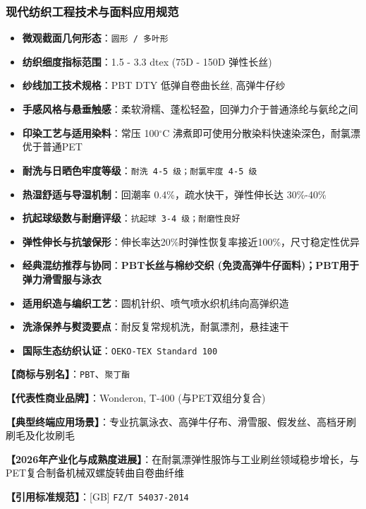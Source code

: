 \documentclass[11pt,openright,twoside,UTF8]{ctexbook}
\begin{document}
\subsubsection*{现代纺织工程技术与面料应用规范}
\begin{itemize} \setlength{\itemsep}{2pt}
    \item \textbf{微观截面几何形态}：\texttt{圆形 / 多叶形}
    \item \textbf{纺织细度指标范围}：1.5 - 3.3 dtex (75D - 150D 弹性长丝)
    \item \textbf{纱线加工技术规格}：PBT DTY 低弹自卷曲长丝, 高弹牛仔纱
    \item \textbf{手感风格与悬垂触感}：柔软滑糯、蓬松轻盈，回弹力介于普通涤纶与氨纶之间
    \item \textbf{印染工艺与适用染料}：常压 100$^\circ\mathrm{C}$ 沸煮即可使用分散染料快速染深色，耐氯漂优于普通PET
    \item \textbf{耐洗与日晒色牢度等级}：\texttt{耐洗 4-5 级；耐氯牢度 4-5 级}
    \item \textbf{热湿舒适与导湿机制}：回潮率 0.4\%，疏水快干，弹性伸长达 30\%-40\%
    \item \textbf{抗起球级数与耐磨评级}：\texttt{抗起球 3-4 级；耐磨性良好}
    \item \textbf{弹性伸长与抗皱保形}：伸长率达20\%时弹性恢复率接近100\%，尺寸稳定性优异
    \item \textbf{经典混纺推荐与协同}：\textbf{PBT长丝与棉纱交织 (免烫高弹牛仔面料)；PBT用于弹力滑雪服与泳衣}
    \item \textbf{适用织造与编织工艺}：圆机针织、喷气喷水织机纬向高弹织造
    \item \textbf{洗涤保养与熨烫要点}：耐反复常规机洗，耐氯漂剂，悬挂速干
    \item \textbf{国际生态纺织认证}：\texttt{OEKO-TEX Standard 100}
\end{itemize}
\vspace{0.2cm}

\noindent\textbf{【商标与别名】}：\texttt{PBT}、\texttt{聚丁酯}\par
\noindent\textbf{【代表性商业品牌】}：Wonderon, T-400 (与PET双组分复合)\par
\noindent\textbf{【典型终端应用场景】}：专业抗氯泳衣、高弹牛仔布、滑雪服、假发丝、高档牙刷刷毛及化妆刷毛\par
\noindent\textbf{【2026年产业化与成熟度进展】}：在耐氯漂弹性服饰与工业刷丝领域稳步增长，与PET复合制备机械双螺旋转曲自卷曲纤维\par
\noindent\textbf{【引用标准规范】}：[GB] \texttt{FZ/T 54037-2014}\par
\vspace{0.5cm}
\end{document}
